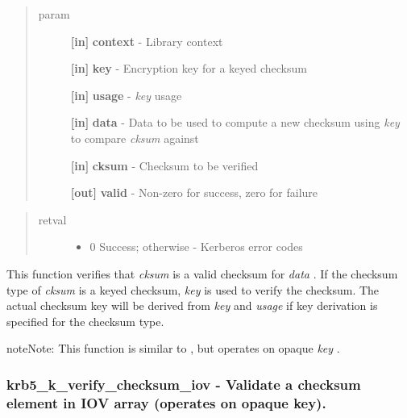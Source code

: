 \documentclass[letterpaper,10pt,english]{sphinxmanual}
\begin{document}
\begin{quote}\begin{description}
\item[{param}] \leavevmode
\textbf{{[}in{]}} \textbf{context} - Library context

\textbf{{[}in{]}} \textbf{key} - Encryption key for a keyed checksum

\textbf{{[}in{]}} \textbf{usage} - \emph{key} usage

\textbf{{[}in{]}} \textbf{data} - Data to be used to compute a new checksum using \emph{key} to compare \emph{cksum} against

\textbf{{[}in{]}} \textbf{cksum} - Checksum to be verified

\textbf{{[}out{]}} \textbf{valid} - Non-zero for success, zero for failure

\end{description}\end{quote}
\begin{quote}\begin{description}
\item[{retval}] \leavevmode\begin{itemize}
\item {} 
0   Success; otherwise - Kerberos error codes

\end{itemize}

\end{description}\end{quote}

This function verifies that \emph{cksum} is a valid checksum for \emph{data} . If the checksum type of \emph{cksum} is a keyed checksum, \emph{key} is used to verify the checksum. The actual checksum key will be derived from \emph{key} and \emph{usage} if key derivation is specified for the checksum type.

\begin{notice}{note}{Note:}
This function is similar to {\hyperref[appdev/refs/api/krb5_c_verify_checksum:c.krb5_c_verify_checksum]{}} , but operates on opaque \emph{key} .
\end{notice}


\subsubsection{krb5\_k\_verify\_checksum\_iov -  Validate a checksum element in IOV array (operates on opaque key).}
\label{appdev/refs/api/krb5_k_verify_checksum_iov:krb5-k-verify-checksum-iov-validate-a-checksum-element-in-iov-array-operates-on-opaque-key}\label{appdev/refs/api/krb5_k_verify_checksum_iov::doc}
\end{document}
